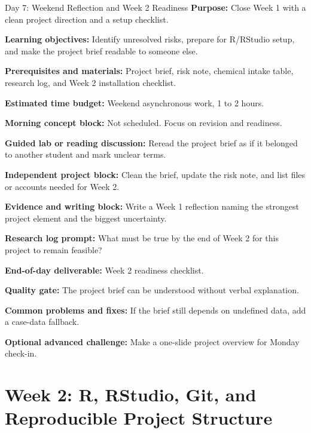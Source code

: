 \begin{dailybox}{Day 7: Weekend Reflection and Week 2 Readiness}
\textbf{Purpose:} Close Week 1 with a clean project direction and a setup checklist.

\textbf{Learning objectives:} Identify unresolved risks, prepare for R/RStudio setup, and make the project brief readable to someone else.

\textbf{Prerequisites and materials:} Project brief, risk note, chemical intake table, research log, and Week 2 installation checklist.

\textbf{Estimated time budget:} Weekend asynchronous work, 1 to 2 hours.

\textbf{Morning concept block:} Not scheduled. Focus on revision and readiness.

\textbf{Guided lab or reading discussion:} Reread the project brief as if it belonged to another student and mark unclear terms.

\textbf{Independent project block:} Clean the brief, update the risk note, and list files or accounts needed for Week 2.

\textbf{Evidence and writing block:} Write a Week 1 reflection naming the strongest project element and the biggest uncertainty.

\textbf{Research log prompt:} What must be true by the end of Week 2 for this project to remain feasible?

\textbf{End-of-day deliverable:} Week 2 readiness checklist.

\textbf{Quality gate:} The project brief can be understood without verbal explanation.

\textbf{Common problems and fixes:} If the brief still depends on undefined data, add a case-data fallback.

\textbf{Optional advanced challenge:} Make a one-slide project overview for Monday check-in.
\end{dailybox}

\section{Week 2: R, RStudio, Git, and Reproducible Project Structure}

